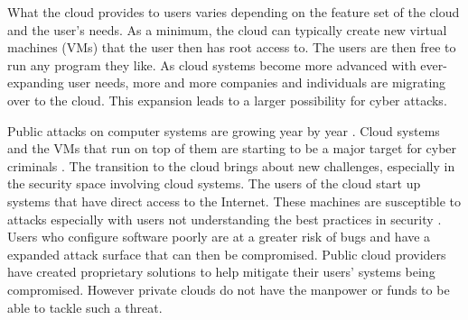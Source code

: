 \documentclass[12pt]{article}
\begin{document}
What the cloud provides to users varies depending on the feature set of the cloud and the user's needs. As a minimum, the cloud can typically create new virtual machines (VMs) that the user then has root access to. The users are then free to run any program they like. As cloud systems become more advanced with ever-expanding user needs, more and more companies and individuals are migrating over to the cloud\cite{kondo2009cost}. This expansion leads to a larger possibility for cyber attacks.

Public attacks on computer systems are growing year by year \cite{newman_2017}. Cloud systems and the VMs that run on top of them are starting to be a major target for cyber criminals \cite{kellerman}. The transition to the cloud brings about new challenges, especially in the security space involving cloud systems. The users of the cloud start up systems that have direct access to the Internet. These machines are susceptible to attacks especially with users not understanding the best practices in security \cite{ng2009studying}. Users who configure software poorly are at a greater risk of bugs and have a expanded attack surface that can then be compromised.  Public cloud providers have created proprietary solutions to help mitigate their users' systems being compromised. However private clouds do not have the manpower or funds to be able to tackle such a threat.

\end{document}
